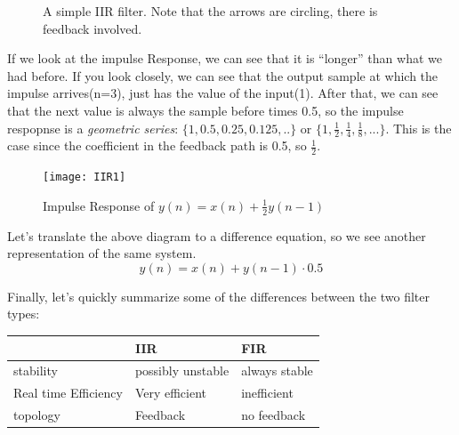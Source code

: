 \begin{figure}[htb]
  \centering
  \label{fig:IIRlowpass}

  \caption{A simple IIR filter. Note that the arrows are circling, there is feedback involved.}
\end{figure}


If we look at the impulse Response, we can see that it is  ``longer'' than what we had before. If you look closely, we can see that the output sample at which the impulse arrives(n=3), just has the value of the input(1). After that, we can see that the next value is always the sample before times 0.5, so the impulse respopnse is a \textit{geometric series}: $\{1,0.5,0.25,0.125,..\}$ or $\{1, \frac{1}{2}, \frac{1}{4}, \frac{1}{8}, ...\}$. This is the case since the coefficient in the feedback path is 0.5, so $\frac{1}{2}$.


\begin{figure}[H]
	\centering
	\texttt{[image: IIR1]}
	\caption[Impulse Response of $y(n)=x(n)+\frac{1}{2}y(n-1)$]
	{Impulse Response of $y(n)=x(n)+\frac{1}{2}y(n-1)$}
	\label{fig:label}
\end{figure}

Let's translate the above diagram to a difference equation, so we see another representation of the same system.
\begin{equation}
 	y(n) = x(n)+y(n-1) \cdot 0.5
 \end{equation}

Finally, let's quickly summarize some of the differences between the two filter types:
\begin{center}

\begin{tabular}{l|l|l}

& \textbf{IIR} & \textbf{FIR} \\
\hline
stability & possibly unstable & always stable \\
Real time Efficiency & Very efficient & inefficient \\
topology & Feedback & no feedback \\

\end{tabular}
\end{center}

